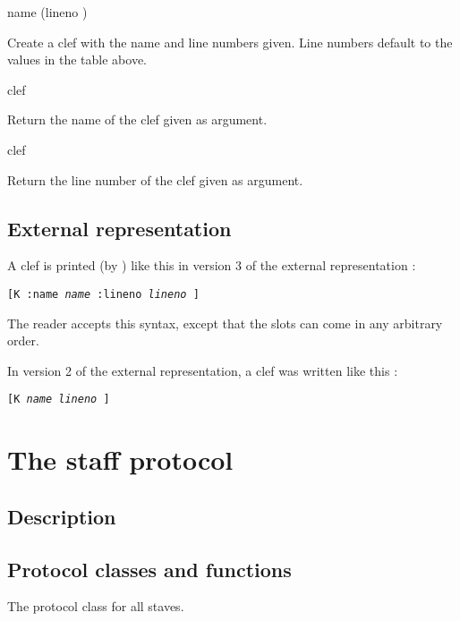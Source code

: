 


 {name \optional (lineno )}

Create a clef with the name and line numbers given.  Line numbers
default to the values in the table above. 

 {clef}

Return the name of the clef given as argument.

 {clef}

Return the line number of the clef given as argument. 

\subsection{External representation}

A clef is printed (by ) like this in version 3
of the external representation :

\texttt{[K :name \textit{name} :lineno \textit{lineno} ]}

The reader accepts this syntax, except that the slots can come in any
arbitrary order. 

In version 2 of the external representation, a clef was written like
this :

\texttt{[K \textit{name} \textit{lineno} ]}

\section{The staff protocol}

\subsection{Description}

\subsection{Protocol classes and functions}


The protocol class for all staves. 


